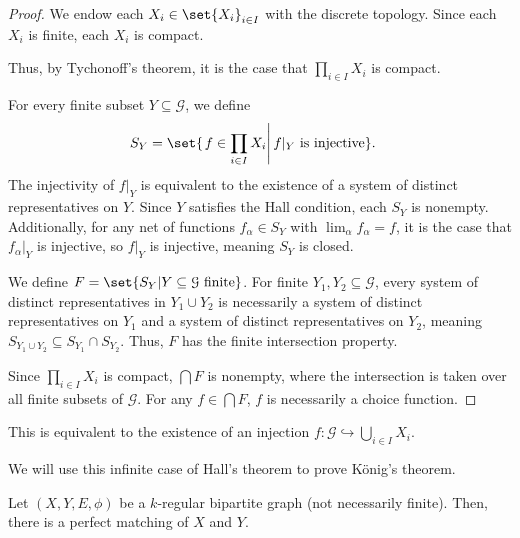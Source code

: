 \documentclass[10pt]{mypackage2}
\begin{document}
\begin{proof}
  We endow each $X_i\in \set{X_{i}}_{i\in I}$ with the discrete topology. Since each $X_i$ is finite, each $X_i$ is compact.\newline

  Thus, by Tychonoff's theorem, it is the case that $\prod_{i\in I}X_{i}$ is compact.\newline

  For every finite subset $Y\subseteq \mathcal{G}$, we define
  \begin{align*}
    S_Y &= \set{\left.f\in \prod_{i\in I}X_i\right|f\vert_{Y}\text{ is injective}}.
  \end{align*}
  The injectivity of $f\vert_{Y}$ is equivalent to the existence of a system of distinct representatives on $Y$. Since $Y$ satisfies the Hall condition, each $S_{Y}$ is nonempty. Additionally, for any net of functions $f_{\alpha}\in S_{Y}$ with $\lim_{\alpha}f_{\alpha} = f$, it is the case that $f_{\alpha}\vert_{Y}$ is injective, so $f\vert_{Y}$ is injective, meaning $S_{Y}$ is closed.\newline

  We define $F = \set{S_{Y}| Y\subseteq \mathcal{G}\text{ finite}}$. For finite $Y_{1},Y_{2}\subseteq \mathcal{G}$, every system of distinct representatives in $Y_1\cup Y_2$ is necessarily a system of distinct representatives on $Y_1$ and a system of distinct representatives on $Y_{2}$, meaning $S_{Y_1\cup Y_2}\subseteq S_{Y_1}\cap S_{Y_2}$. Thus, $F$ has the finite intersection property.\newline

  Since $\prod_{i\in I}X_i$ is compact, $\bigcap F$ is nonempty, where the intersection is taken over all finite subsets of $\mathcal{G}$. For any $f\in \bigcap F$, $f$ is necessarily a choice function.
\end{proof}
\begin{remark}
  This is equivalent to the existence of an injection $f\colon \mathcal{G}\hookrightarrow \bigcup_{i\in I}X_i$.
\end{remark}
We will use this infinite case of Hall's theorem to prove König's theorem. 
\begin{theorem}
  Let $\left(X,Y,E,\phi\right)$ be a $k$-regular bipartite graph (not necessarily finite). Then, there is a perfect matching of $X$ and $Y$.\label{thm:konig}
\end{theorem}
\end{document}
